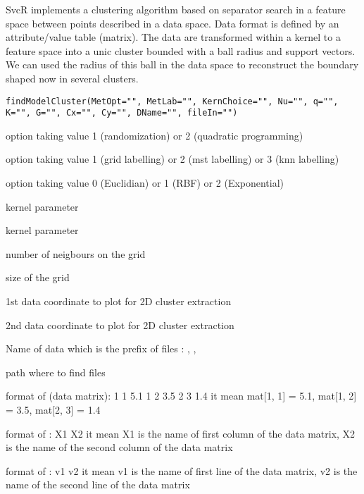 \begin{Description}\relax
SvcR implements a clustering algorithm based on separator search in a feature 
space between points described in a data space. Data format is defined by 
an attribute/value table (matrix). The data are transformed within a kernel 
to a feature space into a unic cluster bounded with a ball radius and support vectors. 
We can used the radius of this ball in the data space 
to reconstruct the boundary shaped now in several clusters.
\end{Description}
\begin{Usage}
\begin{verbatim}
findModelCluster(MetOpt="", MetLab="", KernChoice="", Nu="", q="", K="", G="", Cx="", Cy="", DName="", fileIn="")
\end{verbatim}
\end{Usage}
\begin{Arguments}
\begin{ldescription}
\item[\code{MetOpt}] option taking value 1 (randomization) or 2 (quadratic programming) 
\item[\code{MetLab}] option taking value 1 (grid labelling) or 2 (mst labelling) or 3 (knn labelling) 
\item[\code{KernChoice}] option taking value 0 (Euclidian) or 1 (RBF) or 2 (Exponential) 
\item[\code{Nu}] kernel parameter  
\item[\code{q}] kernel parameter 
\item[\code{K}] number of neigbours on the grid 
\item[\code{G}] size of the grid 
\item[\code{Cx}] 1st data coordinate to plot for 2D cluster extraction 
\item[\code{Cy}] 2nd data coordinate to plot for 2D cluster extraction 
\item[\code{DName}] Name of data which is the prefix of files :
, 
, 
\item[\code{fileIn}] path where to find files 
\end{ldescription}
\end{Arguments}
\begin{Details}\relax
format of  (data matrix): 
1 1 5.1       
1 2 3.5
2 3 1.4
it mean mat[1, 1] = 5.1, mat[1, 2] = 3.5, mat[2, 3] = 1.4

format of  : 
X1
X2
it mean X1 is the name of first column of the data matrix, X2 is the name of the second column of the data matrix

format of  : 
v1
v2
it mean v1 is the name of first line of the data matrix, v2 is the name of the second line of the data matrix
\end{Details}
